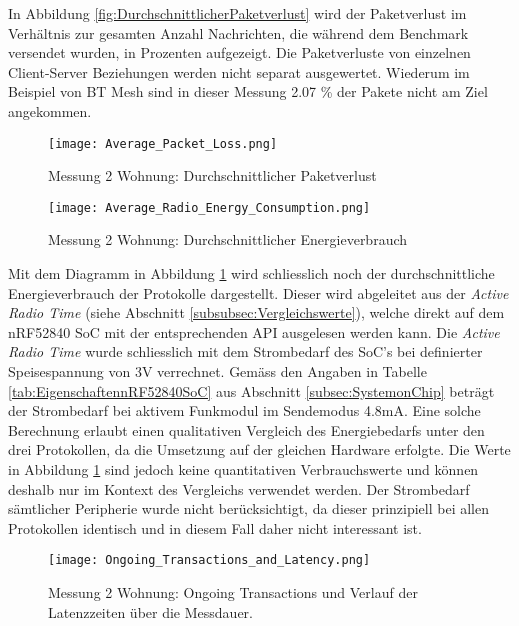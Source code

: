 In Abbildung \ref{fig:DurchschnittlicherPaketverlust} wird der Paketverlust im Verhältnis zur gesamten Anzahl Nachrichten, die während dem Benchmark versendet wurden, in Prozenten aufgezeigt.
Die Paketverluste von einzelnen Client-Server Beziehungen werden nicht separat ausgewertet.
Wiederum im Beispiel von BT Mesh sind in dieser Messung 2.07 \% der Pakete nicht am Ziel angekommen.

\begin{figure}[!htbp]
\centering
\begin{minipage}[b]{0.49\textwidth}
		\centering
		\texttt{[image: Average\_Packet\_Loss.png]}
		\caption{Messung 2 Wohnung: Durchschnittlicher Paketverlust}
		\label{fig:DurchschnittlicherPaketverlust}
\end{minipage}
\begin{minipage}[b]{0.49\textwidth}
		\centering
		\texttt{[image: Average\_Radio\_Energy\_Consumption.png]}
		\caption{Messung 2 Wohnung: Durchschnittlicher Energieverbrauch}
		\label{fig:DurchschnittlicherEnergieverbrauch}
\end{minipage}
\end{figure}

Mit dem Diagramm in Abbildung \ref{fig:DurchschnittlicherEnergieverbrauch} wird schliesslich noch der durchschnittliche Energieverbrauch der Protokolle dargestellt.
Dieser wird abgeleitet aus der \textit{Active Radio Time} (siehe Abschnitt \ref{subsubsec:Vergleichswerte}), welche direkt auf dem nRF52840 SoC mit der entsprechenden API ausgelesen werden kann.
Die \textit{Active Radio Time} wurde schliesslich mit dem Strombedarf des SoC's bei definierter Speisespannung von 3V verrechnet.
Gemäss den Angaben in Tabelle \ref{tab:EigenschaftennRF52840SoC} aus Abschnitt \ref{subsec:SystemonChip} beträgt der Strombedarf bei aktivem Funkmodul im Sendemodus 4.8mA.
Eine solche Berechnung erlaubt einen qualitativen Vergleich des Energiebedarfs unter den drei Protokollen, da die Umsetzung auf der gleichen Hardware erfolgte.
Die Werte in Abbildung \ref{fig:DurchschnittlicherEnergieverbrauch} sind jedoch keine quantitativen Verbrauchswerte und können deshalb nur im Kontext des Vergleichs verwendet werden.
Der Strombedarf sämtlicher Peripherie wurde nicht berücksichtigt, da dieser prinzipiell bei allen Protokollen identisch und in diesem Fall daher nicht interessant ist.

\begin{figure}[h]
	\centering
	\texttt{[image: Ongoing\_Transactions\_and\_Latency.png]}
	\caption{Messung 2 Wohnung: Ongoing Transactions und Verlauf der Latenzzeiten über die Messdauer.}
	\label{fig:OngoingTransactions}
\end{figure}

